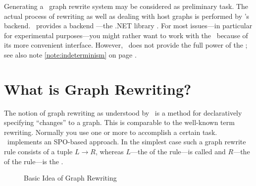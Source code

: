 Generating a \GrG\ graph rewrite system may be considered as preliminary task.
The actual process of rewriting as well as dealing with host graphs is performed by \GrG's backend.
\GrG\ provides a backend ---the .NET library \LibGr.
For most issues---in particular for experimental purposes---you might rather want to work with the \GrShell\ because of its more convenient interface.
However, \GrShell\ does not provide the full power of the \LibGr; see also note \ref{note:indeterminism} on page \pageref{note:indeterminism}.

\section{What is Graph Rewriting?}
\label{ov:whatsallabout}

The notion of graph rewriting as understood by \GrG\ is a method for declaratively specifying ``changes'' to a graph.
This is comparable to the well-known term rewriting. 
Normally you use one or more  to accomplish a certain task.
\GrG\ implements an SPO-based approach.
In the simplest case such a graph rewrite rule consists of a tuple $L \rightarrow R$, whereas $L$---the  of the rule---is called  and $R$---the  of the rule---is the .

\begin{figure}[htbp]
	\centering
  \caption{Basic Idea of Graph Rewriting}
  \label{figrule}
\end{figure}

